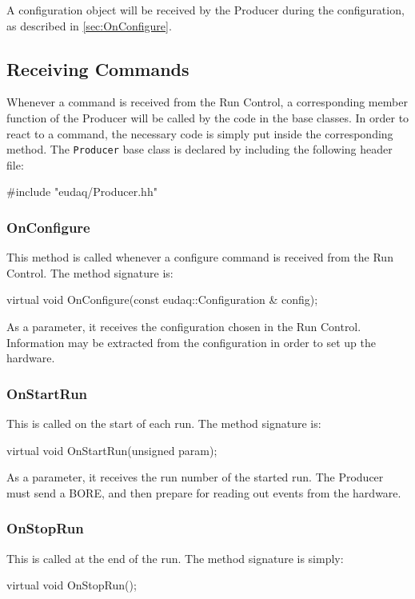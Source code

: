 A configuration object will be received by the Producer during the configuration,
as described in \autoref{sec:OnConfigure}.

\subsection{Receiving Commands}
Whenever a command is received from the Run Control,
a corresponding member function of the Producer will be called by the code in the base classes.
In order to react to a command, the necessary code is simply put inside the corresponding method.
The \texttt{Producer} base class is declared by including the following header file:
\begin{listing}
#include "eudaq/Producer.hh"
\end{listing}

\subsubsection{OnConfigure}\label{sec:OnConfigure}
This method is called whenever a configure command is received from the Run Control.
The method signature is:
\begin{listing}
virtual void OnConfigure(const eudaq::Configuration & config);
\end{listing}

As a parameter, it receives the configuration chosen in the Run Control.
Information may be extracted from the configuration in order to set up the hardware.

\subsubsection{OnStartRun}
This is called on the start of each run.
The method signature is:
\begin{listing}
virtual void OnStartRun(unsigned param);
\end{listing}

As a parameter, it receives the run number of the started run.
The Producer must send a \gls{BORE},
and then prepare for reading out events from the hardware.

\subsubsection{OnStopRun}
This is called at the end of the run.
The method signature is simply:
\begin{listing}
virtual void OnStopRun();
\end{listing}


